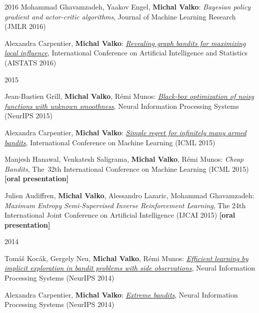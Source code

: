 \documentclass{resume}
\begin{document}
\begin{category}{2016}
\citembullet
Mohammad Ghavamzadeh, Yaakov Engel, {\bf Michal Valko}:
\emph{Bayesian policy gradient and actor-critic algorithms},
Journal of Machine Learning Research
({\sf JMLR 2016}) 


\citembullet
Alexandra Carpentier, {\bf Michal Valko}:
\href{http://researchers.lille.inria.fr/~valko/hp/serve.php?what=publications/carpentier2016revealing.pdf}
{\emph{Revealing graph bandits for maximizing local influence}},
International Conference on Artificial Intelligence and Statistics
({\sf AISTATS 2016}) 

\end{category}\begin{category}{2015}

\citembullet
Jean-Bastien Grill, {\bf Michal Valko}, R\' emi Munos:
\href{http://researchers.lille.inria.fr/~valko/hp/serve.php?what=publications/grill2015black-box.pdf}
{\emph{Black-box optimization of noisy functions with unknown smoothness}},
Neural Information Processing Systems
({\sf NeurIPS 2015}) 

\citembullet
Alexandra Carpentier, {\bf Michal Valko}:
\href{http://researchers.lille.inria.fr/~valko/hp/serve.php?what=publications/carpentier2015simple.pdf}
{\emph{Simple regret for infinitely many armed bandits}},
International Conference on Machine Learning
({\sf ICML 2015}) 


\citembullet
Manjesh Hanawal, Venkatesh Saligrama, {\bf Michal Valko},  R\' emi Munos:
\emph{Cheap Bandits},
The~32th International Conference on Machine Learning
({\sf ICML 2015}) {\bf [oral presentation]}

\citembullet
Julien Audiffren, {\bf Michal Valko},  Alessandro Lazaric, Mohammad Ghavamzadeh:
\emph{Maximum Entropy Semi-Supervised Inverse Reinforcement Learning},
 The 24th International Joint Conference on Artificial Intelligence
({\sf IJCAI 2015}) {\bf [oral presentation]}

\end{category}\begin{category}{2014}

\citembullet
Tom\'a\v s Koc\' ak, Gergely Neu, {\bf Michal Valko}, R\' emi Munos:  
\href{http://researchers.lille.inria.fr/~valko/hp/serve.php?what=publications/kocak2014efficient.pdf}
{\emph{Efficient learning by implicit exploration in bandit problems with side observations}}, 
Neural Information Processing Systems ({\sf NeurIPS 2014})

\citembullet
Alexandra Carpentier, {\bf Michal Valko}: 
\href{http://researchers.lille.inria.fr/~valko/hp/serve.php?what=publications/carpentier2014extreme.pdf}
{\emph{Extreme bandits}},
Neural Information Processing Systems ({\sf NeurIPS 2014})


\end{category}
\end{document}
